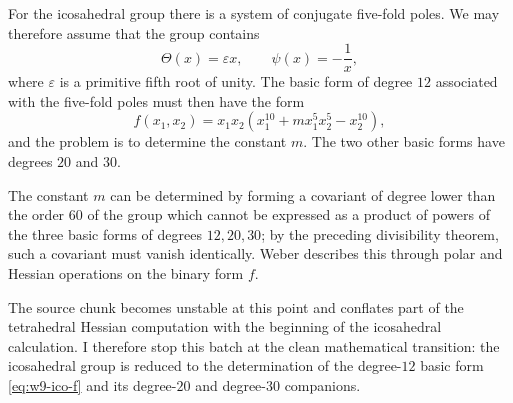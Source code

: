 \documentclass[11pt]{article}
\begin{document}
For the icosahedral group there is a system of conjugate five-fold poles.  We may therefore assume that the group contains
\begin{equation}\label{eq:w9-ico-generators}
 \Theta(x)=\varepsilon x,
 \qquad
 \psi(x)=-\frac1x,
\end{equation}
where $\varepsilon$ is a primitive fifth root of unity.  The basic form of degree $12$ associated with the five-fold poles must then have the form
\begin{equation}\label{eq:w9-ico-f}
 f(x_1,x_2)=x_1x_2(x_1^{10}+m x_1^5x_2^5-x_2^{10}),
\end{equation}
and the problem is to determine the constant $m$.  The two other basic forms have degrees $20$ and $30$.

The constant $m$ can be determined by forming a covariant of degree lower than the order $60$ of the group which cannot be expressed as a product of powers of the three basic forms of degrees $12,20,30$; by the preceding divisibility theorem, such a covariant must vanish identically.  Weber describes this through polar and Hessian operations on the binary form $f$.

The source chunk becomes unstable at this point and conflates part of the tetrahedral Hessian computation with the beginning of the icosahedral calculation.  I therefore stop this batch at the clean mathematical transition: the icosahedral group is reduced to the determination of the degree-$12$ basic form \eqref{eq:w9-ico-f} and its degree-$20$ and degree-$30$ companions.
\end{document}
